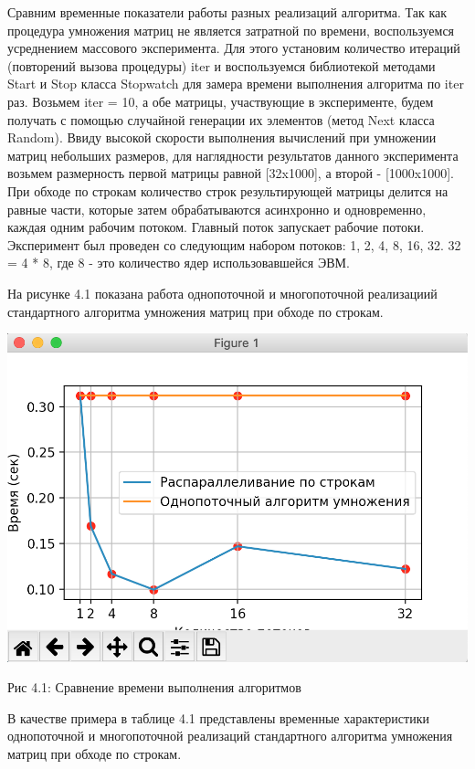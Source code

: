 \documentclass[12pt]{report}
\begin{document}
Сравним временные показатели работы разных реализаций алгоритма. Так как процедура умножения матриц не является затратной по времени, воспользуемся усреднением массового эксперимента. Для этого установим количество итераций (повторений вызова процедуры) iter и воспользуемся библиотекой методами Start и Stop класса Stopwatch для замера времени выполнения алгоритма по iter раз. Возьмем iter = 10, а обе матрицы, участвующие в эксперименте, будем получать с помощью случайной генерации их элементов (метод Next класса Random).
Ввиду высокой скорости выполнения вычислений при умножении матриц небольших размеров, для наглядности результатов данного эксперимента возьмем размерность первой матрицы равной [32x1000], а второй - [1000x1000]. При обходе по строкам количество строк результирующей матрицы делится на равные части, которые затем обрабатываются асинхронно и одновременно, каждая одним рабочим потоком. Главный поток запускает рабочие потоки. Эксперимент был проведен со следующим набором потоков: 1, 2, 4, 8, 16, 32. 32 = 4 * 8, где 8 - это количество ядер использовавшейся ЭВМ.

На рисунке 4.1 показана работа однопоточной и многопоточной реализациий стандартного алгоритма умножения матриц при обходе по строкам.

\begin{center}
		\includegraphics[scale=0.6]{pics/Parallel1.png}
		
			Рис 4.1: Сравнение времени выполнения алгоритмов
\end{center}

В качестве примера в таблице 4.1 представлены временные характеристики однопоточной и многопоточной реализаций стандартного алгоритма умножения матриц при обходе по строкам.
\end{document}
